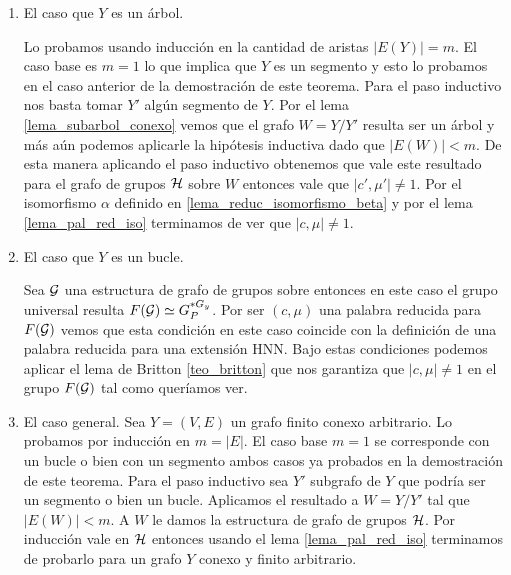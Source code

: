 \documentclass[tesis.tex]{subfiles}
\begin{document}
\begin{enumerate}
		
		\item El caso que $Y$ es un árbol. 
		
		Lo probamos usando inducción en la cantidad de aristas $|E(Y)| = m$.
		El caso base es $m=1$ lo que implica que $Y$ es un segmento y esto lo probamos en el caso anterior de la demostración de este teorema.
		Para el paso inductivo nos basta tomar $Y'$ algún segmento de $Y$.
		Por el lema \ref{lema_subarbol_conexo} vemos que el grafo $W = Y / Y'$ resulta ser un árbol y más aún podemos aplicarle la hipótesis inductiva dado que $|E(W)| < m$. 
		De esta manera aplicando el paso inductivo obtenemos que vale este resultado para el grafo de grupos ${\cal H}$ 
		sobre $W$  entonces vale que $|c',\mu'| \neq 1$.
		Por el isomorfismo $\alpha$ definido en \ref{lema_reduc_isomorfismo_beta} 
		y por el lema \ref{lema_pal_red_iso} terminamos de ver que $|c, \mu| \neq 1$.
		
		\item El caso que $Y$ es un bucle.
	\begin{center}
	\end{center}
		Sea ${\cal G}$ una estructura de grafo de grupos sobre entonces en este caso el grupo universal resulta $F({\cal G}) \simeq G_P^{\ast G_y}$.
		Por ser $(c, \mu)$ una palabra reducida para $F({\cal G})$ vemos que esta condición en este caso coincide con la definición de una palabra reducida para una extensión HNN.		
		Bajo estas condiciones podemos aplicar el lema de Britton \ref{teo_britton} que nos garantiza que $|c, \mu| \neq 1$ en el grupo $F({\cal G})$ tal como queríamos ver.
		
		\item El caso general. 
		Sea $Y = (V,E)$ un grafo finito conexo arbitrario.
		Lo probamos por inducción en $m = |E|$.
		El caso base $m=1$ se corresponde con un bucle o bien con un segmento ambos casos ya probados en la demostración de este teorema.
		Para el paso inductivo sea $Y'$ subgrafo de $Y$ que podría ser un segmento o bien un bucle. 
		Aplicamos el resultado a $W=Y/Y'$ tal que $|E(W)| < m$.
		A $W$ le damos la estructura de grafo de grupos ${\cal H}$.
		Por inducción vale en ${\cal H}$ 
		entonces usando el lema \ref{lema_pal_red_iso} terminamos de probarlo para un grafo $Y$ conexo y finito arbitrario.
	\end{enumerate}
\end{document}
